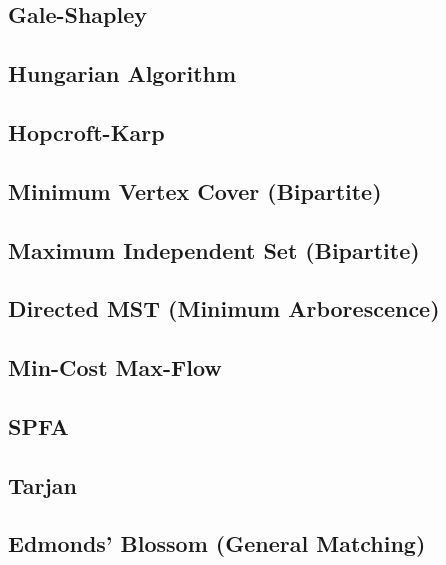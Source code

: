 \documentclass[10pt,letterpaper,landscape,twocolumn]{article}
\begin{document}
\subsection{Gale-Shapley}

\subsection{Hungarian Algorithm}

\subsection{Hopcroft-Karp}

\subsection{Minimum Vertex Cover (Bipartite)}

\subsection{Maximum Independent Set (Bipartite)}

\subsection{Directed MST (Minimum Arborescence)}

\subsection{Min-Cost Max-Flow}

\subsection{SPFA}

\subsection{Tarjan}

\subsection{Edmonds' Blossom (General Matching)}

\end{document}
